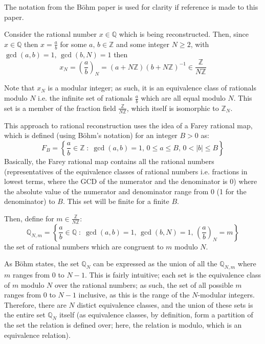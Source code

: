 \documentclass[letterpaper,12pt,titlepage,oneside,final]{book}
\begin{document}
The notation from the B\"ohm paper is used for clarity if reference is made to this paper.

Consider the rational number ${x \in \mathbb{Q}}$ which is being reconstructed.  Then, since ${x \in \mathbb{Q}}$ then ${x = \frac{a}{b}}$ for some ${a,\,b \in \mathbb{Z}}$ and some integer ${N \geq 2}$, with ${\gcd(a, b) = 1,\, \gcd(b, N) = 1}$ then
\begin{equation*}
  x_N = \left(\frac{a}{b}\right)_N = (a + N\mathbb{Z})(b + N\mathbb{Z})^{-1} \in \frac{\mathbb{Z}}{N\mathbb{Z}}
\end{equation*}   

Note that ${x_N}$ is a modular integer; as such, it is an equivalence class of rationals modulo ${N}$ i.e. the infinite set of rationals ${\frac{a}{b}}$ which are all equal modulo ${N}$.  This set is a member of the fraction field ${\frac{\mathbb{Z}}{N\mathbb{Z}}}$, which itself is isomorphic to ${\mathbb{Z}_N}$.

This approach to rational reconstruction uses the idea of a Farey rational map, which is defined (using B\"ohm's notation) for an integer ${B > 0}$ as:
\begin{equation*}
  F_B = \left\{\frac{a}{b} \in \mathbb{Z}\; : \; \gcd(a, b) = 1,\, 0 \leq a \leq B,\, 0 < |b| \leq B\right\}
\end{equation*}
Basically, the Farey rational map contains all the rational numbers (representatives of the equivalence classes of rational numbers i.e. fractions in lowest terms, where the GCD of the numerator and the denominator is 0) where the absolute value of the numerator and denominator range from 0 (1 for the denominator) to ${B}$.  This set will be finite for a finite ${B}$.

Then, define for ${m \in \frac{\mathbb{Z}}{N\mathbb{Z}}}$:
\begin{equation*}
  \mathbb{Q}_{N, m} = \left\{\frac{a}{b} \in \mathbb{Q}\; : \; \gcd(a, b) = 1,\, \gcd(b, N) = 1,\, \left(\frac{a}{b}\right)_N = m\right\}
\end{equation*}
the set of rational numbers which are congruent to ${m}$ modulo ${N}$.  

As B\"ohm states, the set ${\mathbb{Q}_N}$ can be expressed as the union of all the ${\mathbb{Q}_{N, m}}$ where ${m}$ ranges from 0 to ${N - 1}$.  This is fairly intuitive; each set is the equivalence class of ${m}$ modulo ${N}$ over the rational numbers; as such, the set of all possible ${m}$ ranges from 0 to ${N - 1}$ inclusive, as this is the range of the ${N}$-modular integers.  Therefore, there are ${N}$ distict equivalence classes, and the union of these sets is the entire set ${\mathbb{Q}_N}$ itself (as equivalence classes, by definition, form a partition of the set the relation is defined over; here, the relation is modulo, which is an equivalence relation).  
\end{document}
